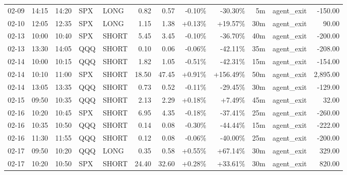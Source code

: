 \documentclass[11pt,a4paper,twoside]{article}
\begin{document}
\begin{center}
\begin{longtable}{>{\color{txtmain}}l l l l l r r r r r >{\color{txtmain}}l r}
02-09 & 14:15 & 14:20 & SPX & LONG & 0.82 & 0.57 & \textcolor{lossred}{-0.10\%} & \textcolor{lossred}{-30.30\%} & 5m & agent\_exit & \textcolor{lossred}{-150.00} \\
02-10 & 12:05 & 12:35 & SPX & LONG & 1.15 & 1.38 & \textcolor{wingreen}{+0.13\%} & \textcolor{wingreen}{+19.57\%} & 30m & agent\_exit & \textcolor{wingreen}{90.00} \\
02-13 & 10:00 & 10:40 & SPX & SHORT & 5.45 & 3.45 & \textcolor{lossred}{-0.10\%} & \textcolor{lossred}{-36.70\%} & 40m & agent\_exit & \textcolor{lossred}{-200.00} \\
02-13 & 13:30 & 14:05 & QQQ & SHORT & 0.10 & 0.06 & \textcolor{lossred}{-0.06\%} & \textcolor{lossred}{-42.11\%} & 35m & agent\_exit & \textcolor{lossred}{-208.00} \\
02-14 & 10:00 & 10:15 & QQQ & SHORT & 1.82 & 1.05 & \textcolor{lossred}{-0.51\%} & \textcolor{lossred}{-42.31\%} & 15m & agent\_exit & \textcolor{lossred}{-154.00} \\
02-14 & 10:10 & 11:00 & SPX & SHORT & 18.50 & 47.45 & \textcolor{wingreen}{+0.91\%} & \textcolor{wingreen}{+156.49\%} & 50m & agent\_exit & \textcolor{wingreen}{2,895.00} \\
02-14 & 13:05 & 13:35 & QQQ & SHORT & 0.73 & 0.52 & \textcolor{lossred}{-0.11\%} & \textcolor{lossred}{-29.45\%} & 30m & agent\_exit & \textcolor{lossred}{-129.00} \\
02-15 & 09:50 & 10:35 & QQQ & SHORT & 2.13 & 2.29 & \textcolor{wingreen}{+0.18\%} & \textcolor{wingreen}{+7.49\%} & 45m & agent\_exit & \textcolor{wingreen}{32.00} \\
02-16 & 10:20 & 10:45 & SPX & SHORT & 6.95 & 4.35 & \textcolor{lossred}{-0.18\%} & \textcolor{lossred}{-37.41\%} & 25m & agent\_exit & \textcolor{lossred}{-260.00} \\
02-16 & 10:35 & 10:50 & QQQ & SHORT & 0.14 & 0.08 & \textcolor{lossred}{-0.30\%} & \textcolor{lossred}{-44.44\%} & 15m & agent\_exit & \textcolor{lossred}{-222.00} \\
02-16 & 11:30 & 11:55 & QQQ & SHORT & 0.12 & 0.08 & \textcolor{lossred}{-0.06\%} & \textcolor{lossred}{-40.00\%} & 25m & agent\_exit & \textcolor{lossred}{-200.00} \\
02-17 & 09:50 & 10:20 & QQQ & LONG & 0.35 & 0.58 & \textcolor{wingreen}{+0.55\%} & \textcolor{wingreen}{+67.14\%} & 30m & agent\_exit & \textcolor{wingreen}{329.00} \\
02-17 & 10:20 & 10:50 & SPX & SHORT & 24.40 & 32.60 & \textcolor{wingreen}{+0.28\%} & \textcolor{wingreen}{+33.61\%} & 30m & agent\_exit & \textcolor{wingreen}{820.00} \\

\end{longtable}
\end{center}
\end{document}
